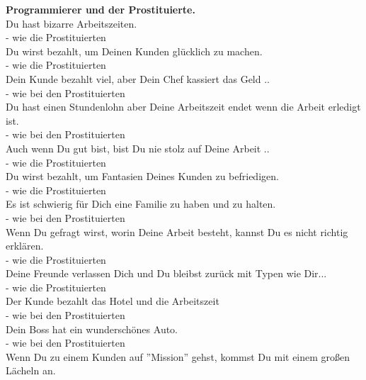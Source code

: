 \textbf{Programmierer und der Prostituierte.}  \\
\newline
Du hast bizarre Arbeitszeiten. \\
- wie die Prostituierten \\
\newline
Du wirst bezahlt, um Deinen Kunden glücklich zu machen. \\
- wie die Prostituierten \\
\newline
Dein Kunde bezahlt viel, aber Dein Chef kassiert das Geld .. \\
- wie bei den Prostituierten \\
\newline
Du hast einen Stundenlohn aber Deine Arbeitszeit endet wenn die Arbeit erledigt ist. \\
- wie bei den Prostituierten \\
\newline
Auch wenn Du gut bist, bist Du nie stolz auf Deine Arbeit .. \\
- wie die Prostituierten \\
\newline
Du wirst bezahlt, um Fantasien Deines Kunden zu befriedigen. \\
- wie die Prostituierten \\
\newline
Es ist schwierig für Dich eine Familie zu haben und zu halten. \\
- wie bei den Prostituierten \\
\newline
Wenn Du gefragt wirst, worin Deine Arbeit besteht, kannst Du es nicht richtig erklären. \\
- wie die Prostituierten \\
\newline
Deine Freunde verlassen Dich und Du bleibst zurück mit Typen wie Dir... \\
- wie die Prostituierten \\
\newline
Der Kunde bezahlt das Hotel und die Arbeitszeit\\
- wie bei den Prostituierten \\
\newline
Dein Boss hat ein wunderschönes Auto. \\
- wie bei den Prostituierten \\
\newline
Wenn Du zu einem Kunden auf ''Mission'' gehst, kommst Du mit einem großen Lächeln an. \\
